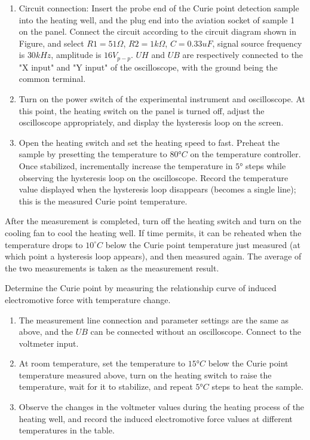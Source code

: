 \documentclass[UTF8]{article}
\begin{document}
	\begin{enumerate}
	    \item Circuit connection: Insert the probe end of the Curie point detection sample into the heating well, and the plug end into the aviation socket of sample 1 on the panel. Connect the circuit according to the circuit diagram shown in Figure, and select \(R1=51\Omega\), \(R2=1k\Omega\), \(C=0.33uF\), signal source frequency is \(30kHz\), amplitude is \(16V_{p-p}\). \(UH\) and \(UB\) are respectively connected to the "X input" and "Y input" of the oscilloscope, with the ground being the common terminal.
	    
	    \item Turn on the power switch of the experimental instrument and oscilloscope. At this point, the heating switch on the panel is turned off, adjust the oscilloscope appropriately, and display the hysteresis loop on the screen.
	    
	    \item Open the heating switch and set the heating speed to fast. Preheat the sample by presetting the temperature to \(80°C\) on the temperature controller. Once stabilized, incrementally increase the temperature in \(5°\) steps while observing the hysteresis loop on the oscilloscope. Record the temperature value displayed when the hysteresis loop disappears (becomes a single line); this is the measured Curie point temperature.
	\end{enumerate}
	
	After the measurement is completed, turn off the heating switch and turn on the cooling fan to cool the heating well. If time permits, it can be reheated when the temperature drops to $10 ^{\circ}C$ below the Curie point temperature just measured (at which point a hysteresis loop appears), and then measured again. The average of the two measurements is taken as the measurement result.
	
	Determine the Curie point by measuring the relationship curve of induced
	electromotive force with temperature change.
	
	\begin{enumerate}
	    \item The measurement line connection and parameter settings are the same as above, and the \(UB\) can be connected without an oscilloscope. Connect to the voltmeter input.
	    
	    \item At room temperature, set the temperature to \(15°C\) below the Curie point temperature measured above, turn on the heating switch to raise the temperature, wait for it to stabilize, and repeat \(5°C\) steps to heat the sample.
	    
	    \item Observe the changes in the voltmeter values during the heating process of the heating well, and record the induced electromotive force values at different temperatures in the table.
	\end{enumerate}
	
\end{document}
